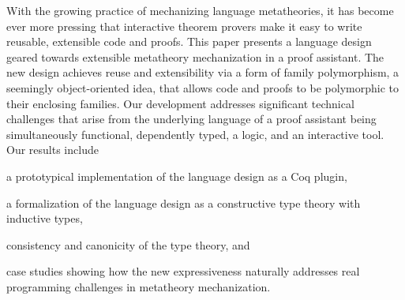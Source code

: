 
With the growing practice of mechanizing language metatheories,
it has become ever more pressing that interactive theorem provers 
make it easy to write reusable, extensible code and proofs.
%
This paper presents a language design geared towards extensible metatheory
mechanization in a proof assistant.
The new design achieves reuse and extensibility via a form of family
polymorphism, a seemingly object-oriented idea, that allows code and
proofs to be polymorphic to their enclosing families.
Our development addresses significant technical challenges that arise
from the underlying language of a proof assistant being simultaneously
functional, dependently typed, a logic, and an interactive tool.
%
Our results include
\begin{enumerate*}
\item a prototypical implementation of the language design as a Coq plugin,
\item a formalization of the language design as a constructive type theory with inductive types,
\item consistency and canonicity of the type theory,
and 
\item case studies showing how the new expressiveness naturally addresses real
programming challenges in metatheory mechanization.
\end{enumerate*}